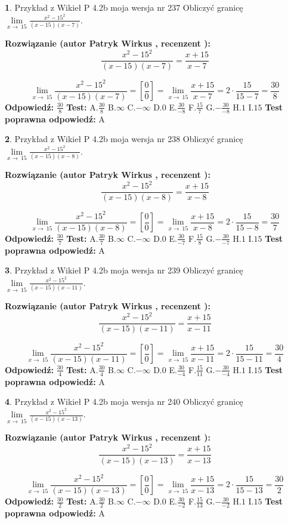 \documentclass[12pt, a4paper]{article}
\theoremstyle{definition} %
\newtheorem{zad}{}
\newcommand{\zadStart}[1]{\begin{zad}#1\newline}
\newcommand{\zadStop}{\end{zad}}
\newcommand{\rozwStart}[2]{\noindent \textbf{Rozwiązanie (autor #1 , recenzent #2): }\newline}
\newcommand{\rozwStop}{\newline}
\newcommand{\odpStart}{\noindent \textbf{Odpowiedź:}\newline}
\newcommand{\odpStop}{\newline}
\newcommand{\testStart}{\noindent \textbf{Test:}\newline}
\newcommand{\testStop}{\newline}
\newcommand{\kluczStart}{\noindent \textbf{Test poprawna odpowiedź:}\newline}
\newcommand{\kluczStop}{\newline}
\begin{document}
\zadStart{Przykład z Wikieł P 4.2b moja wersja nr 237}
Obliczyć granicę $\lim\limits_{x\to\ 15}\frac{x^{2}-15^{2}}{(x-15)(x-7)}$.
\zadStop
\rozwStart{Patryk Wirkus}{}
$$\frac{x^{2}-15^{2}}{(x-15)(x-7)}=\frac{x+15}{x-7}$$

$$\lim\limits_{x\to\ 15}\frac{x^{2}-15^{2}}{(x-15)(x-7)}=[\frac{0}{0}]=\lim\limits_{x\to\ 15}\frac{x+15}{x-7}=2 \cdot \frac{15}{15-7} = \frac{30}{8}$$
\rozwStop
\odpStart
$\frac{30}{8}$
\odpStop
\testStart
A.$\frac{30}{8}$
B.$\infty$
C.$-\infty$
D.$0$
E.$\frac{30}{-8}$
F.$\frac{15}{7}$
G.$-\frac{30}{-8}$
H.$1$
I.$15$
\testStop
\kluczStart
A
\kluczStop



\zadStart{Przykład z Wikieł P 4.2b moja wersja nr 238}
Obliczyć granicę $\lim\limits_{x\to\ 15}\frac{x^{2}-15^{2}}{(x-15)(x-8)}$.
\zadStop
\rozwStart{Patryk Wirkus}{}
$$\frac{x^{2}-15^{2}}{(x-15)(x-8)}=\frac{x+15}{x-8}$$

$$\lim\limits_{x\to\ 15}\frac{x^{2}-15^{2}}{(x-15)(x-8)}=[\frac{0}{0}]=\lim\limits_{x\to\ 15}\frac{x+15}{x-8}=2 \cdot \frac{15}{15-8} = \frac{30}{7}$$
\rozwStop
\odpStart
$\frac{30}{7}$
\odpStop
\testStart
A.$\frac{30}{7}$
B.$\infty$
C.$-\infty$
D.$0$
E.$\frac{30}{-7}$
F.$\frac{15}{8}$
G.$-\frac{30}{-7}$
H.$1$
I.$15$
\testStop
\kluczStart
A
\kluczStop



\zadStart{Przykład z Wikieł P 4.2b moja wersja nr 239}
Obliczyć granicę $\lim\limits_{x\to\ 15}\frac{x^{2}-15^{2}}{(x-15)(x-11)}$.
\zadStop
\rozwStart{Patryk Wirkus}{}
$$\frac{x^{2}-15^{2}}{(x-15)(x-11)}=\frac{x+15}{x-11}$$

$$\lim\limits_{x\to\ 15}\frac{x^{2}-15^{2}}{(x-15)(x-11)}=[\frac{0}{0}]=\lim\limits_{x\to\ 15}\frac{x+15}{x-11}=2 \cdot \frac{15}{15-11} = \frac{30}{4}$$
\rozwStop
\odpStart
$\frac{30}{4}$
\odpStop
\testStart
A.$\frac{30}{4}$
B.$\infty$
C.$-\infty$
D.$0$
E.$\frac{30}{-4}$
F.$\frac{15}{11}$
G.$-\frac{30}{-4}$
H.$1$
I.$15$
\testStop
\kluczStart
A
\kluczStop



\zadStart{Przykład z Wikieł P 4.2b moja wersja nr 240}
Obliczyć granicę $\lim\limits_{x\to\ 15}\frac{x^{2}-15^{2}}{(x-15)(x-13)}$.
\zadStop
\rozwStart{Patryk Wirkus}{}
$$\frac{x^{2}-15^{2}}{(x-15)(x-13)}=\frac{x+15}{x-13}$$

$$\lim\limits_{x\to\ 15}\frac{x^{2}-15^{2}}{(x-15)(x-13)}=[\frac{0}{0}]=\lim\limits_{x\to\ 15}\frac{x+15}{x-13}=2 \cdot \frac{15}{15-13} = \frac{30}{2}$$
\rozwStop
\odpStart
$\frac{30}{2}$
\odpStop
\testStart
A.$\frac{30}{2}$
B.$\infty$
C.$-\infty$
D.$0$
E.$\frac{30}{-2}$
F.$\frac{15}{13}$
G.$-\frac{30}{-2}$
H.$1$
I.$15$
\testStop
\kluczStart
A
\kluczStop
\end{document}
